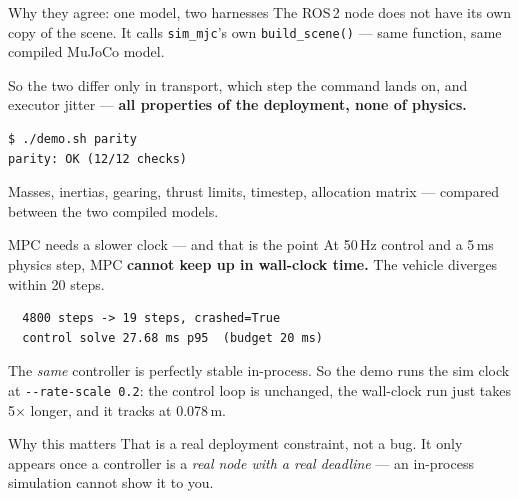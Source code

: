 \documentclass[aspectratio=169,11pt]{beamer}
\newcommand{\file}[1]{\texttt{\small #1}}
\newcommand{\cue}[1]{\textbf{\color{keyc}#1}}
\begin{document}
\begin{frame}[fragile]{Why they agree: one model, two harnesses}
  The ROS\,2 node does not have its own copy of the scene. It calls
  \file{sim\_mjc}'s own \file{build\_scene()} --- same function, same compiled
  MuJoCo model.

  \vspace{0.3cm}
  \begin{center}
  \end{center}

  \vspace{0.2cm}
  So the two differ only in transport, which step the command lands on, and
  executor jitter --- \cue{all properties of the deployment, none of physics.}

  \vspace{0.3cm}
\begin{lstlisting}
$ ./demo.sh parity
parity: OK (12/12 checks)
\end{lstlisting}

  \vspace{0.1cm}
  {\footnotesize Masses, inertias, gearing, thrust limits, timestep, allocation
  matrix --- compared between the two compiled models.}
\end{frame}

\begin{frame}[fragile]{MPC needs a slower clock --- and that is the point}
  At 50\,Hz control and a 5\,ms physics step, MPC \cue{cannot keep up in
  wall-clock time.} The vehicle diverges within 20 steps.

  \vspace{0.25cm}
\begin{lstlisting}
  4800 steps -> 19 steps, crashed=True
  control solve 27.68 ms p95  (budget 20 ms)
\end{lstlisting}

  \vspace{0.2cm}
  The \emph{same} controller is perfectly stable in-process. So the demo runs
  the sim clock at \texttt{-{}-rate-scale 0.2}: the control loop is unchanged,
  the wall-clock run just takes 5$\times$ longer, and it tracks at 0.078\,m.

  \vspace{0.35cm}
  \begin{block}{Why this matters}
    {\small That is a real deployment constraint, not a bug. It only appears
    once a controller is a \emph{real node with a real deadline} --- an
    in-process simulation cannot show it to you.}
  \end{block}
\end{frame}
\end{document}
